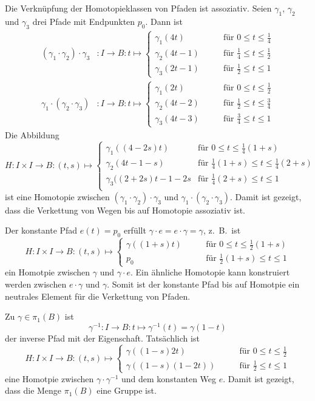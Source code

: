 Die Verknüpfung der Homotopieklassen von Pfaden ist assoziativ.
Seien $\gamma_1$, $\gamma_2$ und $\gamma_3$ drei Pfade mit Endpunkten
$p_0$.
Dann ist
\begin{align*}
(\gamma_1\cdot\gamma_2)\cdot\gamma_3
&\colon
I
\to
B
:
t
\mapsto
\begin{cases}
\gamma_1(4t)&\qquad\text{für $0\le t\le \frac14$}\\
\gamma_2(4t-1)&\qquad\text{für $\frac14\le t\le \frac12$}\\
\gamma_3(2t-1)&\qquad\text{für $\frac12\le t\le 1$}
\end{cases}
\\
\gamma_1\cdot(\gamma_2\cdot\gamma_3)
&\colon
I
\to
B
:
t
\mapsto
\begin{cases}
\gamma_1(2t)&\qquad\text{für $0\le t\le \frac12$}\\
\gamma_2(4t-2)&\qquad\text{für $\frac12\le t\le \frac34$}\\
\gamma_3(4t-3)&\qquad\text{für $\frac34\le t\le 1$}
\end{cases}
\end{align*}
Die Abbildung
\[
H\colon I\times I \to B
:
(t,s)
\mapsto
\begin{cases}
\gamma_1((4-2s)t)     &\text{für $0\le t\le \frac14(1+s)$}\\
\gamma_2(4t-1-s)      &\text{für $\frac14(1+s) \le t \le \frac14(2+s) $}\\
\gamma_3((2+2s)t-1-2s &\text{für $\frac14(2+s) \le t \le 1$}\\
\end{cases}
\]
ist eine Homotopie zwischen 
$(\gamma_1\cdot\gamma_2)\cdot\gamma_3$
und
$\gamma_1\cdot(\gamma_2\cdot\gamma_3)$.
Damit ist gezeigt, dass die Verkettung von Wegen bis auf Homotopie
assoziativ ist.

Der konstante Pfad $e(t) = p_0$ erfüllt
$\gamma\cdot e=e\cdot \gamma = \gamma$, z.~B.~ist 
\[
H
\colon
I\times I \to B
:
(t,s)
\mapsto
\begin{cases}
\gamma((1+s)t) &\qquad\text{für $0\le t \le \frac12(1+s)$}\\
p_0            &\qquad\text{für $\frac12(1+s)\le t\le 1$}
\end{cases}
\]
ein Homotpie zwischen $\gamma$ und $\gamma\cdot e$.
Ein ähnliche Homotopie kann konstruiert werden zwischen $e\cdot\gamma$
und $\gamma$.
Somit ist der konstante Pfad bis auf Homotpie ein neutrales Element 
für die Verkettung von Pfaden.

Zu $\gamma\in \pi_1(B)$ ist
\[
\gamma^{-1}
\colon
I\to B
:
t\mapsto \gamma^{-1}(t) = \gamma(1-t)
\]
der inverse Pfad mit der Eigenschaft.
Tatsächlich ist
\[
H
\colon
I\times I
\to
B
:
(t,s)
\mapsto
\begin{cases}
\gamma((1-s)2t)    &\qquad\text{für $0\le t\le \frac12$}\\
\gamma((1-s)(1-2t))&\qquad\text{für $\frac12\le t\le 1$}
\end{cases}
\]
eine Homotpie zwischen $\gamma\cdot\gamma^{-1}$ und dem konstanten
Weg $e$.
Damit ist gezeigt, dass die Menge $\pi_1(B)$ eine Gruppe ist.

